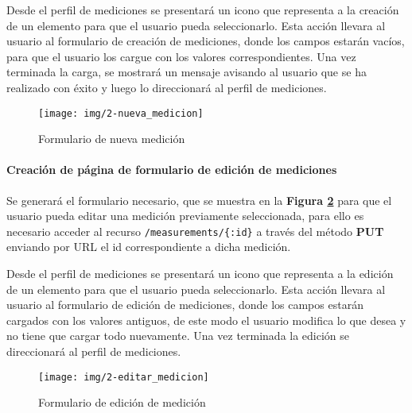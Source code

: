 Desde el perfil de mediciones se presentará un icono que representa a la creación de un elemento para que el usuario pueda seleccionarlo. Esta acción llevara al usuario al formulario de creación de mediciones, donde los campos estarán vacíos, para que el usuario los cargue con los valores correspondientes. Una vez terminada la carga, se mostrará un mensaje avisando al usuario que se ha realizado con éxito y luego lo direccionará al perfil de mediciones.

\begin{figure}[h]
	\centering
	\texttt{[image: img/2-nueva\_medicion]}
	\caption{Formulario de nueva medición}
	\label{nueva_medicion}
\end{figure}

\clearpage
\paragraph{Creación de página de formulario de edición de mediciones}
Se generará el formulario necesario, que se muestra en la \textbf{Figura \ref{editar_medicion}} para que el usuario pueda editar una medición previamente seleccionada, para ello es necesario acceder al recurso \texttt{/measurements/\{:id\}} a través del método \textbf{PUT} enviando por URL el id correspondiente a dicha medición. 

Desde el perfil de mediciones se presentará un icono que representa a la edición de un elemento para que el usuario pueda seleccionarlo. Esta acción llevara al usuario al formulario de edición de mediciones, donde los campos estarán cargados con los valores antiguos, de este modo el usuario modifica lo que desea y no tiene que cargar todo nuevamente. Una vez terminada la edición se direccionará al perfil de mediciones.

\begin{figure}[h]
	\centering
	\texttt{[image: img/2-editar\_medicion]}
	\caption{Formulario de edición de medición}
	\label{editar_medicion}
\end{figure}




